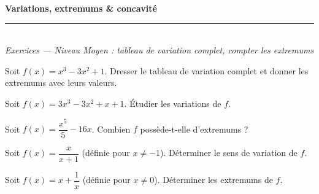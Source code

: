 \documentclass[11pt,a4paper]{article}
\begin{document}
\begin{center}
{\LARGE\bfseries\color{primarydark} Variations, extremums \& concavité}\\[2pt]
{\color{primary}\rule{0.5\textwidth}{1.2pt}}\\[4pt]
{\small\itshape Exercices --- Niveau Moyen : tableau de variation complet, compter les extremums}
\end{center}
\vspace{2mm}

\begin{exo}[1]
Soit $f(x)=x^3-3x^2+1$. Dresser le tableau de variation complet et donner
les extremums avec leurs valeurs.
\end{exo}

\begin{exo}[2]
Soit $f(x)=3x^3-3x^2+x+1$. Étudier les variations de $f$.
\end{exo}

\begin{exo}[3]
Soit $f(x)=\dfrac{x^5}{5}-16x$. Combien $f$ possède-t-elle d'extremums ?
\end{exo}

\begin{exo}[4]
Soit $f(x)=\dfrac{x}{x+1}$ (définie pour $x\neq -1$). Déterminer le sens de variation de $f$.
\end{exo}

\begin{exo}[5]
Soit $f(x)=x+\dfrac{1}{x}$ (définie pour $x\neq 0$). Déterminer les extremums de $f$.
\end{exo}
\end{document}
